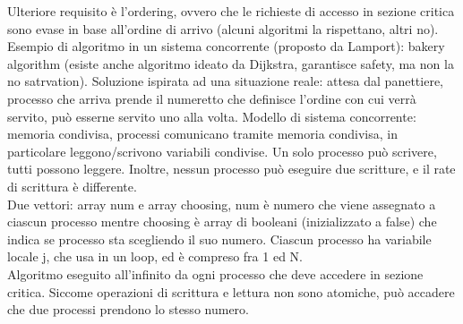 \documentclass{article}
\begin{document}
Ulteriore requisito è l'ordering, ovvero che le richieste di accesso in sezione critica sono evase in base all'ordine di arrivo (alcuni algoritmi la rispettano, altri no).\\ Esempio di algoritmo in un sistema concorrente (proposto da Lamport): bakery algorithm (esiste anche algoritmo ideato da Dijkstra, garantisce safety, ma non la no satrvation). Soluzione ispirata ad una situazione reale: attesa dal panettiere, processo che arriva prende il numeretto che definisce l'ordine con cui verrà servito, può esserne servito uno alla volta. Modello di sistema concorrente: memoria condivisa, processi comunicano tramite memoria condivisa, in particolare leggono/scrivono variabili condivise. Un solo processo può scrivere, tutti possono leggere. Inoltre, nessun processo può eseguire due scritture, e il rate di scrittura è differente.\\ Due vettori: array num e array choosing, num è numero che viene assegnato a ciascun processo mentre choosing è array di booleani (inizializzato a false) che indica se processo sta scegliendo il suo numero. Ciascun processo ha variabile locale j, che usa in un loop, ed è compreso fra 1 ed N.\\ Algoritmo eseguito all'infinito da ogni processo che deve accedere in sezione critica. Siccome operazioni di scrittura e lettura non sono atomiche, può accadere che due processi prendono lo stesso numero.
\end{document}
